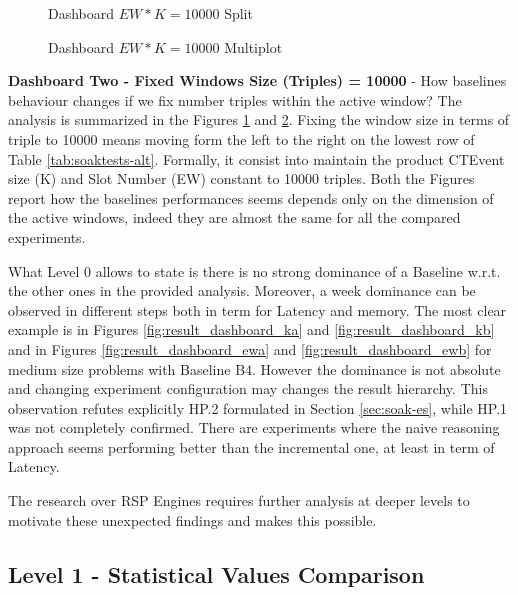 \begin{figure}[tbh]
	\centering
	\caption{Dashboard $EW*K=10000$ Split} 
	\label{fig:result_dashboard_proba}
\end{figure}

\begin{figure}[tbh]
	\centering
	\caption{Dashboard $EW*K=10000$ Multiplot}
	\label{fig:result_dashboard_probb}
\end{figure}

\textbf{Dashboard Two - Fixed Windows Size (Triples) = 10000 } - How baselines behaviour changes if we fix number triples within the active window? The analysis is summarized in the Figures \ref{fig:result_dashboard_proba} and \ref{fig:result_dashboard_probb}. Fixing the window size in terms of triple to 10000 means moving form the left to the right on the lowest row of Table \ref{tab:soaktests-alt}. Formally, it consist into maintain the product CTEvent size (K) and Slot Number (EW) constant to 10000 triples. Both the Figures report how the baselines performances seems depends only on the dimension of the active windows, indeed they are almost the same for all the compared experiments.

What Level 0 allows to state is there is no strong dominance of a Baseline w.r.t. the other ones in the provided analysis. Moreover, a week dominance can be observed in different steps both in term for Latency  and memory. The most clear example is in Figures \ref{fig:result_dashboard_ka} and \ref{fig:result_dashboard_kb} and in Figures \ref{fig:result_dashboard_ewa} and \ref{fig:result_dashboard_ewb} for medium size problems with Baseline B4. 
However the dominance is not absolute and changing experiment configuration may changes the result hierarchy. This observation refutes explicitly HP.2 formulated in Section \ref{sec:soak-es}, while HP.1 was not completely confirmed. There are experiments where the naive  reasoning  approach seems performing better than the incremental one, at least in term of Latency. 

The research over RSP Engines requires further analysis at deeper levels to  motivate these unexpected findings and \name makes this possible.

\subsection{Level 1 -  Statistical Values Comparison}

